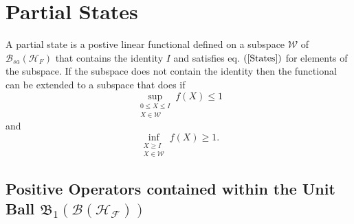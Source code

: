 \documentclass[aps,preprint]{revtex4}%
\begin{document}
\section{Partial States}

A partial state is a postive linear functional defined on a subspace
$\mathcal{W}$ of $\mathcal{B}_{sa}\left(  \mathcal{H}_{F}\right)  $ that
contains the identity $I$ and satisfies eq. $\left(  \ref{States}\right)  $
for elements of the subspace. If the subspace does not contain the identity
then the functional can be extended to a subspace that does if
\begin{equation}
\sup_{\substack{0\leq X\leq I\\X\in\mathcal{W}}}f\left(  X\right)  \leq1
\end{equation}
and%
\begin{equation}
\inf_{\substack{X\geq I\\X\in\mathcal{W}}}f\left(  X\right)  \geq1.
\end{equation}


\subsection{Positive Operators contained within the Unit Ball $\mathfrak{B}%
_{1}\left(  \mathcal{B}\left(  \mathcal{H}_{\mathcal{F}}\right)  \right)  $}
\end{document}
